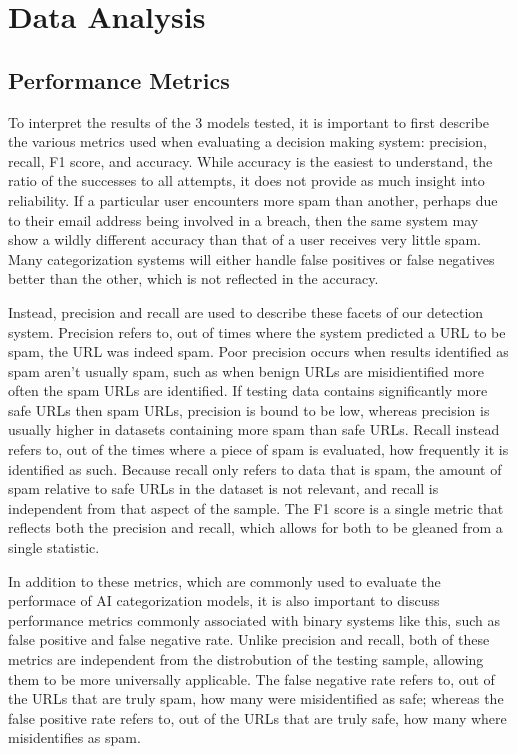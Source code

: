 \section{Data Analysis}

\subsection{Performance Metrics}
To interpret the results of the 3 models tested, it is important to first describe the various metrics used when evaluating a decision making system: precision, recall, F1 score, and accuracy. While accuracy is the easiest to understand, the ratio of the successes to all attempts, it does not provide as much insight into reliability. If a particular user encounters more spam than another, perhaps due to their email address being involved in a breach, then the same system may show a wildly different accuracy than that of a user receives very little spam. Many categorization systems will either handle false positives or false negatives better than the other, which is not reflected in the accuracy.

Instead, precision and recall are used to describe these facets of our detection system. Precision refers to, out of times where the system predicted a URL to be spam, the URL was indeed spam. Poor precision occurs when results identified as spam aren't usually spam, such as when benign URLs are misidientified more often the spam URLs are identified. If testing data contains significantly more safe URLs then spam URLs, precision is bound to be low, whereas precision is usually higher in datasets containing more spam than safe URLs. Recall instead refers to, out of the times where a piece of spam is evaluated, how frequently it is identified as such. Because recall only refers to data that is spam, the amount of spam relative to safe URLs in the dataset is not relevant, and recall is independent from that aspect of the sample.  The F1 score is a single metric that reflects both the precision and recall, which allows for both to be gleaned from a single statistic.

In addition to these metrics, which are commonly used to evaluate the performace of AI categorization models, it is also important to discuss performance metrics commonly associated with binary systems like this, such as false positive and false negative rate. Unlike precision and recall, both of these metrics are independent from the distrobution of the testing sample, allowing them to be more universally applicable. The false negative rate refers to, out of the URLs that are truly spam, how many were misidentified as safe; whereas the false positive rate refers to, out of the URLs that are truly safe, how many where misidentifies as spam.


